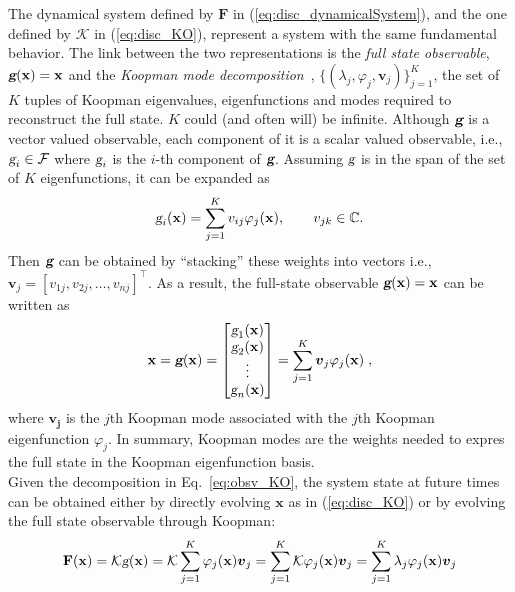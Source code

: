 \par
The dynamical system defined by $\mathbf{F}$ in (\ref{eq:disc_dynamicalSystem}), and the one defined by $\mathcal{K}$ in (\ref{eq:disc_KO}), represent a system with the same fundamental behavior. The link between the two representations is the \textit{full state observable}, $\textsl{\textbf{g}}(\mathbf{x}) = \mathbf{x}$ and the \textit{Koopman mode decomposition}~\cite{rowley_mezic}, $\{(\lambda_j,\varphi_j,\boldsymbol{v}_j)\}_{j=1}^K$, the set of $K$ tuples of Koopman eigenvalues, eigenfunctions and modes required to reconstruct the full state. $K$ could (and often will) be infinite. Although $\textsl{\textbf{g}}$ is a vector valued observable, each component of it is a scalar valued observable, i.e., $\textsl{g}_i\in \mathcal{F}$ where $\textsl{g}_i$ is the $i$-th component of $\textsl{\textbf{g}}$. Assuming $\textsl{g}$ is in the span of the set of $K$ eigenfunctions, it can be expanded \cite{spectral_NL} as
% 
\begin{equation*}
    \textsl{g}_i(\mathbf{x}) = \sum_{j=1}^K v_{ij}\varphi_j(\mathbf{x}) , \quad \quad  v_{jk} \in \mathbb{C}.
\end{equation*}
% 
Then $\textsl{\textbf{g}}$ can be obtained by ``stacking'' these weights into vectors i.e., $\boldsymbol{v}_j = [v_{1j},v_{2j},\dots,v_{nj}]^\top$. As a result, the full-state observable $\textsl{\textbf{g}}(\mathbf{x}) = \mathbf{x}$ can be written as 
% 
\begin{equation}
\label{eq:obsv_KO}
  \mathbf{x} = \textsl{\textbf{g}}(\mathbf{x}) = \begin{bmatrix}
    \textsl{g}_1(\mathbf{x})\\\textsl{g}_2(\mathbf{x})\\ \vdots \\ \textsl{g}_n(\mathbf{x})
    \end{bmatrix} = \sum_{j=1}^K \boldsymbol{v}_j \varphi_j(\mathbf{x})\;,
\end{equation}
% 
where $\boldsymbol{v_j}$ is the $j$th Koopman mode associated with the $j$th Koopman eigenfunction $\varphi_j$. In summary, Koopman modes are the weights needed to expres the full state in the Koopman eigenfunction basis.\\
Given the decomposition in Eq.~\ref{eq:obsv_KO}, the system state at future times can be obtained either by directly evolving $\mathbf{x}$ as in (\ref{eq:disc_KO}) or by evolving the full state observable through Koopman:
% 
\begin{equation}
\label{eq:KO_soln}
    \mathbf{F(x)} = \mathcal{K}\textsl{g}(\mathbf{x}) = \mathcal{K}\sum_{j=1}^K \varphi_j(\mathbf{x})\boldsymbol{v}_j = \sum_{j=1}^K \mathcal{K}\varphi_j(\mathbf{x})\boldsymbol{v}_j = \sum_{j=1}^K\lambda_j\varphi_j(\mathbf{x})\boldsymbol{v}_j 
\end{equation}
